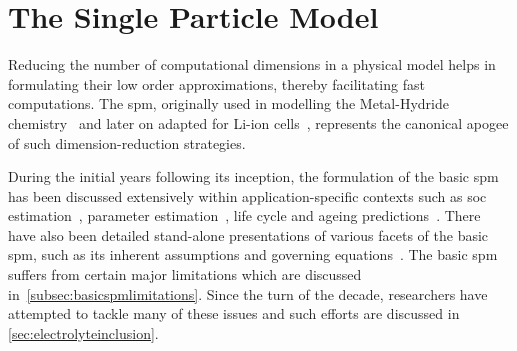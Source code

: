\section{The Single Particle Model}



Reducing  the   number  of   computational  dimensions   in  a   physical  model
helps  in  formulating  their  low order  approximations,  thereby  facilitating
fast   computations.   The  \gls{spm},   originally   used   in  modelling   the
Metal-Hydride    chemistry~\cite{Haran1998}   and    later   on    adapted   for
Li-ion   cells~\cite{Ning2004},  represents   the  canonical   apogee  of   such
dimension-reduction strategies.


During the initial  years following its inception, the formulation  of the basic
\gls{spm} has  been discussed  extensively within  application-specific contexts
such  as  \gls{soc}  estimation~\cite{Santhanagopalan2006a,Santhanagopalan2008},
parameter   estimation~\cite{Santhanagopalan2007},   life   cycle   and   ageing
predictions~\cite{Santhanagopalan2008a,Safari2009}.   There   have   also   been
detailed    stand-alone    presentations    of    various    facets    of    the
basic   \gls{spm},   such   as    its   inherent   assumptions   and   governing
equations~\cite{Santhanagopalan2006,Chaturvedi2010}.    The   basic    \gls{spm}
suffers    from    certain    major     limitations    which    are    discussed
in~\cref{subsec:basicspmlimitations}. Since the turn  of the decade, researchers
have attempted to tackle many of these  issues and such efforts are discussed in
\cref{sec:electrolyteinclusion}.


